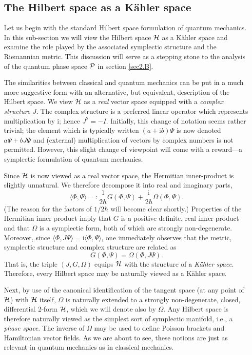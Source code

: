 \documentclass[12pt,aps,eqsecnum,tighten]{revtex4-2}
\def\be{\begin{equation}}
\def\ee{\end{equation}}
\def\<{\langle}
\def\>{\rangle}
\def\i{\mathrm{i}}
\def\H{{\cal H}}
\def\P{{\cal P}}
\def\W{\Omega}
\begin{document}
\subsection{The Hilbert space as a K\"ahler space}
\label{sec2.A}

Let us begin with the standard Hilbert space formulation of quantum
mechanics.  In this sub-section we will view the Hilbert space $\H$ as
a K\"ahler space and examine the role played by the associated
symplectic structure and the Riemannian metric.  This discussion will
serve as a stepping stone to the analysis of the quantum phase space
$\P$ in section \ref{sec2.B}.

The similarities between classical and quantum mechanics can be put in
a much more suggestive form with an alternative, but equivalent,
description of the Hilbert space.  We view $\H$ as a {\em real} vector
space equipped with a {\em complex structure} $J$.  The complex
structure is a preferred linear operator which represents
multiplication by $\i$; hence $J^2 = -{I}$.  Initially, this change of
notation seems rather trivial; the element which is typically written
$(a + \i b)\Psi$ is now denoted $a\Psi + b J\Psi$ and (external)
multiplication of vectors by complex numbers is not permitted.
However, this slight change of viewpoint will come with a reward---a
symplectic formulation of quantum mechanics.

Since $\H$ is now viewed as a real vector space, the Hermitian
inner-product is slightly unnatural.  We therefore decompose it into
real and imaginary parts,
%
\be \< \Phi, \Psi\>
=: \frac{1}{2\hbar}G(\Phi, \Psi) + \frac{\i}{2\hbar}\W(\Phi, \Psi).
\ee 
%
(The reason for the factors of $1/2\hbar$ will become clear shortly.)
Properties of the Hermitian inner-product imply that $G$ is a positive
definite, real inner-product and that $\W$ is a symplectic form, both
of which are strongly non-degenerate.  Moreover, since $\<\Phi, J
\Psi\> = \i \<\Phi, \Psi\>$, one immediately observes that the metric,
symplectic structure and complex structure are related as
%
\be
\label{kahler_reln} G(\Phi, \Psi) = \W(\Phi, J \Psi).  
\ee 
%
That is, the triple $(J, G, \W)$ equips $\H$ with the structure of a
{\em K\"ahler space}.  Therefore, every Hilbert space may be naturally
viewed as a K\"ahler space.

Next, by use of the canonical identification of the tangent space (at
any point of $\H$) with $\H$ itself, $\W$ is naturally extended to a
strongly non-degenerate, closed, differential 2-form $\H$, which we
will denote also by $\W$.  Any Hilbert space is therefore naturally
viewed as the simplest sort of symplectic manifold, i.e., a {\em phase
space}.  The inverse of $\W$ may be used to define Poisson brackets
and Hamiltonian vector fields.  As we are about to see, these notions
are just as relevant in quantum mechanics as in classical mechanics.
\end{document}
